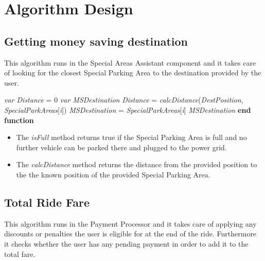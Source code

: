 \section{Algorithm Design}


\subsection{Getting money saving destination}
This algorithm runs in the Special Areas Assistant component and it takes care of looking for the closest Special Parking Area to the destination provided by the user.

\begin{algorithm}
\caption{}\label{euclid}
\begin{algorithmic}[1]
\State \textit{var Distance} = 0
\State \textit{var MSDestination}
\State \textit{Distance} = \textit{calcDistance}(\textit{DestPosition},\textit{ SpecialParkAreas}[\textit{i}])
\State \textit{MSDestination} = \textit{SpecialParkAreas}[\textit{i}]
\EndIf
\EndFor
\State \Return \textit{MSDestination}
\EndFunction
\State \textbf{end function}
\end{algorithmic}
\end{algorithm}

\begin{itemize}
    \item The \textit{isFull} method returns true if the Special Parking Area is full and no further vehicle can be parked there and plugged to the power grid.
    \item The \textit{calcDistance} method returns the distance from the provided position to the the known position of the provided Special Parking Area.
\end{itemize}



\newpage

\subsection{Total Ride Fare}
This algorithm runs in the Payment Processor and it takes care of applying any discounts or penalties the user is eligible for at the end of the ride. Furthermore it checks whether the user has any pending payment in order to add it to the total fare.

